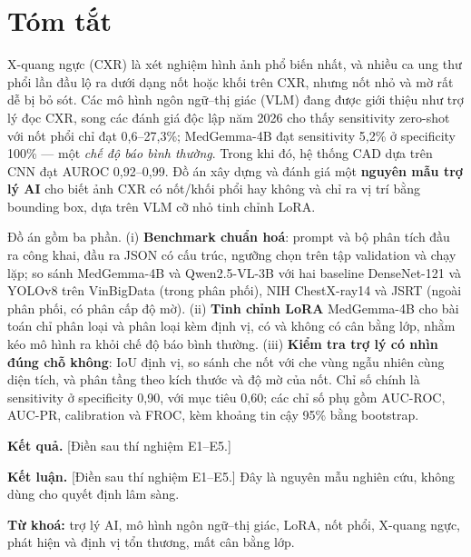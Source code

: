 \section*{Tóm tắt}

X-quang ngực (CXR) là xét nghiệm hình ảnh phổ biến nhất, và nhiều ca ung thư phổi lần đầu lộ ra dưới dạng
nốt hoặc khối trên CXR, nhưng nốt nhỏ và mờ rất dễ bị bỏ sót. Các mô hình ngôn ngữ--thị giác (VLM) đang được
giới thiệu như trợ lý đọc CXR, song các đánh giá độc lập năm 2026 cho thấy sensitivity zero-shot với nốt phổi
chỉ đạt 0,6--27,3\%; MedGemma-4B đạt sensitivity 5,2\% ở specificity 100\% --- một \emph{chế độ báo bình
thường}. Trong khi đó, hệ thống CAD dựa trên CNN đạt AUROC 0,92--0,99. Đồ án xây dựng và đánh giá một
\textbf{nguyên mẫu trợ lý AI} cho biết ảnh CXR có nốt/khối phổi hay không và chỉ ra vị trí bằng bounding box,
dựa trên VLM cỡ nhỏ tinh chỉnh LoRA.

Đồ án gồm ba phần. (i) \textbf{Benchmark chuẩn hoá}: prompt và bộ phân tích đầu ra công khai, đầu ra JSON có
cấu trúc, ngưỡng chọn trên tập validation và chạy lặp; so sánh MedGemma-4B và Qwen2.5-VL-3B với hai baseline
DenseNet-121 và YOLOv8 trên VinBigData (trong phân phối), NIH ChestX-ray14 và JSRT (ngoài phân phối, có phân
cấp độ mờ). (ii) \textbf{Tinh chỉnh LoRA} MedGemma-4B cho bài toán chỉ phân loại và phân loại kèm định vị, có
và không có cân bằng lớp, nhằm kéo mô hình ra khỏi chế độ báo bình thường. (iii) \textbf{Kiểm tra trợ lý có
nhìn đúng chỗ không}: IoU định vị, so sánh che nốt với che vùng ngẫu nhiên cùng diện tích, và phân tầng theo
kích thước và độ mờ của nốt. Chỉ số chính là sensitivity ở specificity 0,90, với mục tiêu 0,60; các chỉ số phụ
gồm AUC-ROC, AUC-PR, calibration và FROC, kèm khoảng tin cậy 95\% bằng bootstrap.

\textbf{Kết quả.} \textcolor{badred}{[Điền sau thí nghiệm E1--E5.]}

\textbf{Kết luận.} \textcolor{badred}{[Điền sau thí nghiệm E1--E5.]} Đây là nguyên mẫu nghiên cứu, không dùng
cho quyết định lâm sàng.

\vspace{0.6em}
\noindent\textbf{Từ khoá:} trợ lý AI, mô hình ngôn ngữ--thị giác, LoRA, nốt phổi, X-quang ngực, phát hiện và
định vị tổn thương, mất cân bằng lớp.
